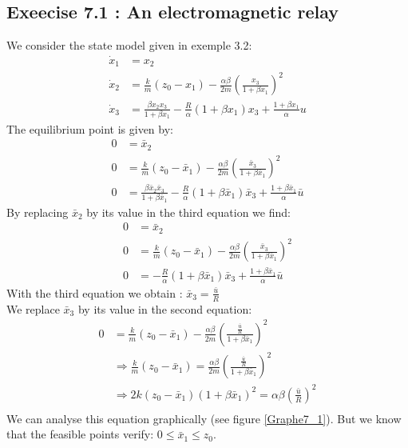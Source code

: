 
\graphicspath{{./TP7/}}

\subsection*{Exeecise 7.1 : An electromagnetic relay}
We consider the state model given in exemple 3.2:
\begin{align*}
\dot{x}_1 &= x_2 \\
\dot{x}_2 &= \frac{k}{m}(z_0-x_1) - \frac{\alpha \beta}{2m} \left( \frac{x_3}{1+\beta x_1} \right)^2 \\
\dot{x}_3 &= \frac{\beta x_2 x_3}{1+\beta x_1} - \frac{R}{\alpha} (1+\beta x_1)x_3 + \frac{1+\beta x_1}{\alpha} u
\end{align*}
The equilibrium point is given by:
\begin{align*}
0 &=  \bar{x}_2 \\
0 &= \frac{k}{m}(z_0-\bar{x}_1) - \frac{\alpha \beta}{2m} \left( \frac{\bar{x}_3}{1+\beta \bar{x}_1} \right)^2 \\
0 &= \frac{\beta \bar{x}_2 \bar{x}_3}{1+\beta \bar{x}_1} - \frac{R}{\alpha} (1+\beta \bar{x}_1)\bar{x}_3 + \frac{1+\beta \bar{x}_1}{\alpha} \bar{u}
\end{align*}
By replacing $\bar{x}_2$ by its value in the third equation we find: 
\begin{align*}
0 &=  \bar{x}_2 \\
0 &= \frac{k}{m}(z_0-\bar{x}_1) - \frac{\alpha \beta}{2m} \left( \frac{\bar{x}_3}{1+\beta \bar{x}_1} \right)^2 \\
0 &=  -\frac{R}{\alpha} (1+\beta \bar{x}_1)\bar{x}_3 + \frac{1+\beta \bar{x}_1}{\alpha} \bar{u}
\end{align*}
With the third equation we obtain : $\bar{x}_3 = \frac{\bar{u}}{R}$\\
We replace $\bar{x}_3$ by its value in the second equation:
\begin{align*}
0 &= \frac{k}{m}(z_0-\bar{x}_1) - \frac{\alpha \beta}{2m} \left( \frac{\frac{\bar{u}}{R}}{1+\beta \bar{x}_1} \right)^2 \\
&\Rightarrow  \frac{k}{m}(z_0-\bar{x}_1) = \frac{\alpha \beta}{2m} \left( \frac{\frac{\bar{u}}{R}}{1+\beta \bar{x}_1} \right)^2 \\
&\Rightarrow  2k(z_0-\bar{x}_1) (1+\beta \bar{x}_1)^2 = \alpha \beta \left( \frac{\bar{u}}{R} \right)^2  \\
\end{align*}
We can analyse this equation graphically (see figure \ref{Graphe7_1}). But we know that the feasible points verify: $0 \le \bar{x}_1 \le z_0$. 
